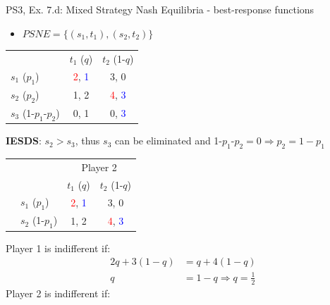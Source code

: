 \begin{frame}{PS3, Ex. 7.d: Mixed Strategy Nash Equilibria - best-response functions}
  \begin{multicols}{2}
    \begin{itemize}
      \item[(d)] $PSNE=\{(s_1,t_1),(s_2,t_2)\}$
    \end{itemize}
    \vspace{-8pt}
    \begin{table}
      \begin{tabular}{l|c|c|}
          \multicolumn{1}{c}{}  & \multicolumn{1}{c}{$t_1$ ($q$)} & \multicolumn{1}{c}{$t_2$ (1-$q$)} \\\cline{2-3}
          $s_1$ ($p_1$)         & \textcolor{red}{2}, \textcolor{blue}{1} & 3, 0 \\\cline{2-3}
          $s_2$ ($p_2$)         & 1, 2 & \textcolor{red}{4}, \textcolor{blue}{3} \\\cline{2-3}
          $s_3$ (1-$p_1$-$p_2$) & 0, 1 & 0, \textcolor{blue}{3} \\\cline{2-3}
      \end{tabular}
    \end{table}
    \vspace{-2pt}
    \textbf{IESDS}: $s_2>s_3$, thus $s_3$ can be eliminated and 1-$p_1$-$p_2=0\Rightarrow p_2=1-p_1$
    \vspace{-6pt}
    \begin{table}
      \begin{tabular}{cl|c|c|}
        & \multicolumn{1}{c}{} & \multicolumn{2}{c}{\color{blue}Player 2}\\
        \parbox[t]{1mm}{}
        &   &  &  \\
        & $s_1$ ($p_1$)  & \textcolor{red}{2}, \textcolor{blue}{1} & 3, 0 \\
        & $s_2$ (1-$p_1$)& 1, 2 & \textcolor{red}{4}, \textcolor{blue}{3} \\
      \end{tabular}
    \end{table}
    Player 1 is indifferent if:
    \begin{align*}
      2q+3(1-q) &= q+4(1-q) \\
      q &= 1-q \Rightarrow q = \frac{1}{2}
    \end{align*}
    Player 2 is indifferent if:

\end{multicols}
\end{frame}
